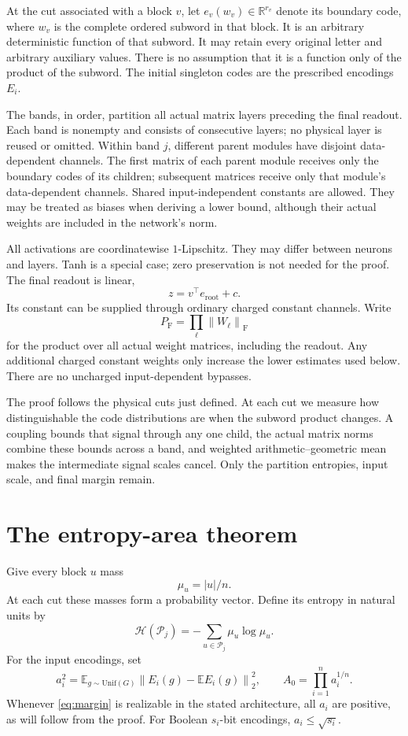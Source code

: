 \documentclass[11pt]{article}
\theoremstyle{remark}\newtheorem{remark}[theorem]{Remark}
\newcommand{\E}{\mathbb E}
\newcommand{\R}{\mathbb R}
\newcommand{\norm}[1]{\left\lVert#1\right\rVert}
\newcommand{\PF}{P_{\mathrm F}}
\newcommand{\cP}{\mathcal P}
\newcommand{\ent}{\mathcal H}
\begin{document}
At the cut associated with a block $v$, let $e_v(w_v)\in\R^{r_v}$ denote
its boundary code, where $w_v$ is the complete ordered subword in that block.
It is an arbitrary deterministic function of that subword. It may retain every
original letter and arbitrary auxiliary values. There is no assumption that
it is a function only of the product of the subword. The initial singleton
codes are the prescribed encodings $E_i$.

The bands, in order, partition all actual matrix layers preceding the final
readout. Each band is nonempty and consists of consecutive layers; no
physical layer is reused or omitted. Within band $j$, different parent modules have disjoint
data-dependent channels. The first matrix of each parent module receives
only the boundary codes of its children; subsequent matrices receive only
that module's data-dependent channels. Shared input-independent constants
are allowed. They may be treated as biases when deriving a lower bound,
although their actual weights are included in the network's norm.

All activations are coordinatewise $1$-Lipschitz. They may differ between
neurons and layers. Tanh is a special case; zero preservation is not needed
for the proof. The final readout is linear,
\[
 z=v^\top e_{\mathrm{root}}+c.
\]
Its constant can be supplied through ordinary charged constant channels.
Write
\[
 \PF=\prod_{\ell}\norm{W_\ell}_{\mathrm F}
\]
for the product over all actual weight matrices, including the readout.
Any additional charged constant weights only increase the lower estimates
used below. There are no uncharged input-dependent bypasses.

The proof follows the physical cuts just defined. At each cut we measure
how distinguishable the code distributions are when the subword product
changes. A coupling bounds that signal through any one child, the actual
matrix norms combine these bounds across a band, and weighted
arithmetic--geometric mean makes the intermediate signal scales cancel.
Only the partition entropies, input scale, and final margin remain.

\section{The entropy-area theorem}

Give every block $u$ mass
\[
 \mu_u=|u|/n.
\]
At each cut these masses form a probability vector. Define its entropy in
natural units by
\[
 \ent(\cP_j)=-\sum_{u\in\cP_j}\mu_u\log\mu_u.
\]
For the input encodings, set
\[
 a_i^2=\E_{g\sim\mathrm{Unif}(G)}
       \norm{E_i(g)-\E E_i(g)}_2^2,
 \qquad A_0=\prod_{i=1}^n a_i^{1/n}.
\]
Whenever \eqref{eq:margin} is realizable in the stated architecture, all
$a_i$ are positive, as will follow from the proof. For Boolean $s_i$-bit
encodings, $a_i\le\sqrt{s_i}$.
\end{document}
